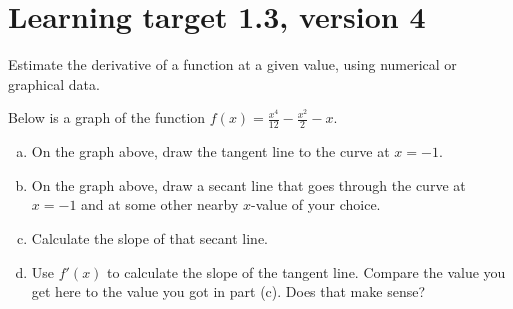 \pagebreak

\section{Learning target 1.3, version 4}


Estimate the derivative of a function at a given value, using numerical or graphical data.

\hrulefill


Below is a graph of the function $\displaystyle f(x)=\frac{x^4}{12}-\frac{x^2}{2}-x$. 
\begin{center}
\end{center}

\begin{enumerate}[(a)]
\item On the graph above, draw the tangent line to the curve at $x=-1$. 

\item On the graph above, draw a secant line that goes through the curve at $x=-1$ and at some other nearby $x$-value of your choice.

\item Calculate the slope of that secant line.

\vfill

\item Use $f'(x)$ to calculate the slope of the tangent line. Compare the value you get here to the value you got in part (c). Does that make sense?

\vfill
\end{enumerate}

\pagebreak


